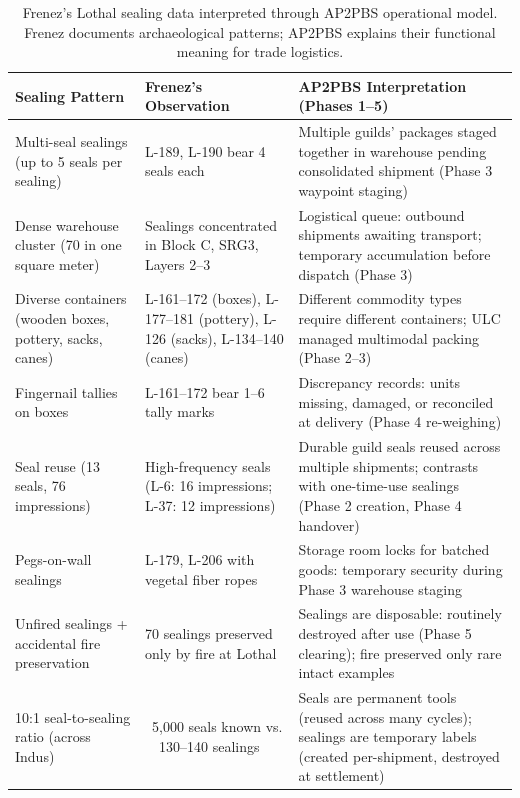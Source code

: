 \documentclass[12pt]{article}
\begin{document}
\begin{table}[H]
\centering
\caption{Frenez's Lothal sealing data interpreted through AP2PBS operational model.
Frenez documents archaeological patterns; AP2PBS explains their functional meaning
for trade logistics.}
\label{tab:frenez_abs_comparison}
\begin{tabular}{@{}p{4cm}p{6cm}p{6cm}@{}}
\toprule
\textbf{Sealing Pattern} & \textbf{Frenez's Observation} & \textbf{AP2PBS
Interpretation (Phases 1–5)} \\
\midrule
Multi-seal sealings (up to 5 seals per sealing) & L-189, L-190 bear 4 seals
each & Multiple guilds' packages staged together in warehouse pending
consolidated shipment (Phase 3 waypoint staging) \\
\midrule
Dense warehouse cluster (70 in one square meter) & Sealings concentrated in
Block C, SRG3, Layers 2–3 & Logistical queue: outbound shipments awaiting
transport; temporary accumulation before dispatch (Phase 3) \\
\midrule
Diverse containers (wooden boxes, pottery, sacks, canes) & L-161–172 (boxes),
L-177–181 (pottery), L-126 (sacks), L-134–140 (canes) & Different commodity
types require different containers; ULC managed multimodal packing
(Phase 2–3) \\
\midrule
Fingernail tallies on boxes & L-161–172 bear 1–6 tally marks & Discrepancy
records: units missing, damaged, or reconciled at delivery (Phase 4 re-weighing) \\
\midrule
Seal reuse (13 seals, 76 impressions) & High-frequency seals (L-6: 16
impressions; L-37: 12 impressions) & Durable guild seals reused across multiple
shipments; contrasts with one-time-use sealings (Phase 2 creation,
Phase 4 handover) \\
\midrule
Pegs-on-wall sealings & L-179, L-206 with vegetal fiber ropes & Storage room
locks for batched goods: temporary security during Phase 3 warehouse staging \\
\midrule
Unfired sealings + accidental fire preservation & 70 sealings preserved only
by fire at Lothal & Sealings are disposable: routinely destroyed after use
(Phase 5 clearing); fire preserved only rare intact examples \\
\midrule
10:1 seal-to-sealing ratio (across Indus) & ~5,000 seals known vs. \ ~130–140
sealings & Seals are permanent tools (reused across many cycles); sealings are
temporary labels (created per-shipment, destroyed at settlement) \\
\bottomrule
\end{tabular}
\end{table}
\end{document}
